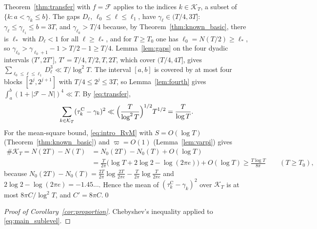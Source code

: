 \documentclass[11pt,a4paper]{article}
\makeatletter
\numberwithin{equation}{section}
\DeclareRobustCommand{\CGref}[1]{\ref{#1}}
\DeclareRobustCommand{\CGeqref}[1]{\eqref{#1}}
\let\CG@origref\ref
\let\CG@origeqref\eqref
\newcommand{\CG@gettip}[1]{\@ifundefined{CGTip@#1}{#1}{\csname CGTip@#1\endcsname}}
\DeclareRobustCommand{\CGref}[1]{\pdftooltip{\CG@origref{#1}}{\CG@gettip{#1}}}
\DeclareRobustCommand{\CGeqref}[1]{\pdftooltip{\CG@origeqref{#1}}{\CG@gettip{#1}}}
\theoremstyle{definition}
\theoremstyle{remark}
\newcommand{\Nz}{N_0} %
\newcommand{\Fc}{\mathcal F}
\newcommand{\Kc}{\mathcal K}
\makeatother
\begin{document}
Theorem~\CGref{thm:transfer} with $f=\Fc$ applies to the indices $k\in\Kc_T$, a subset of $\{k:a<\gamma_k\le b\}$. The gaps $D_\ell$, $\ell_0\le\ell\le\ell_1$, have $\gamma_\ell\in(T/4,3T]$: $\gamma_\ell\le\gamma_{\ell_1}\le b=3T$, and $\gamma_{\ell_0}>T/4$ because, by Theorem~\CGref{thm:known_basic}, there is $\ell_*$ with $D_\ell<1$ for all $\ell\ge\ell_*$, and for $T\ge T_0$ one has $\ell_0=N(T/2)\ge\ell_*$, so $\gamma_{\ell_0}>\gamma_{\ell_0+1}-1>T/2-1\ge T/4$. Lemma~\CGref{lem:gaps} on the four dyadic intervals $(T',2T']$, $T'=T/4,T/2,T,2T$, which cover $(T/4,4T]$, gives $\sum_{\ell_0\le\ell\le\ell_1}D_\ell^3\ll T/\log^2T$. The interval $[a,b]$ is covered by at most four blocks $[2^j,2^{j+1}]$ with $T/4\le2^j\le3T$, so Lemma~\CGref{lem:fourth} gives $\int_a^b(1+|\Fc-N|)^4\ll T$. By \CGeqref{eq:transfer},
\begin{equation}
\sum_{k\in\Kc_T}(\tau_{k}^{\mathrm C}-\gamma_k)^2\ll\Bigl(\frac T{\log^2T}\Bigr)^{1/2}T^{1/2}=\frac T{\log T}.
\label{eq:disp_28}
\end{equation}
For the mean-square bound, \CGeqref{eq:intro_RvM} with $S=O(\log T)$ (Theorem~\CGref{thm:known_basic}) and $\varpi=O(1)$ (Lemma~\CGref{lem:varpi}) gives
\begin{equation}
\begin{aligned}
\#\Kc_T=N(2T)-N(T)&=\Nz(2T)-\Nz(T)+O(\log T)\\
&=\frac T{2\pi}\bigl(\log T+2\log2-\log(2\pi e)\bigr)+O(\log T)\ge\frac{T\log T}{8\pi}\qquad(T\ge T_0),
\end{aligned}
\label{eq:disp_29}
\end{equation}
because $\Nz(2T)-\Nz(T)=\frac{2T}{2\pi}\log\frac{2T}{2\pi e}-\frac T{2\pi}\log\frac T{2\pi e}$ and $2\log2-\log(2\pi e)=-1.45\ldots$. Hence the mean of $(\tau_{k}^{\mathrm C}-\gamma_k)^2$ over $\Kc_T$ is at most $8\pi C/\log^2T$, and $C'=8\pi C$.\qed

\begin{proof}[Proof of Corollary~\ref{cor:proportion}]
Chebyshev's inequality applied to \CGeqref{eq:main_sublevel}.
\end{proof}
\end{document}
